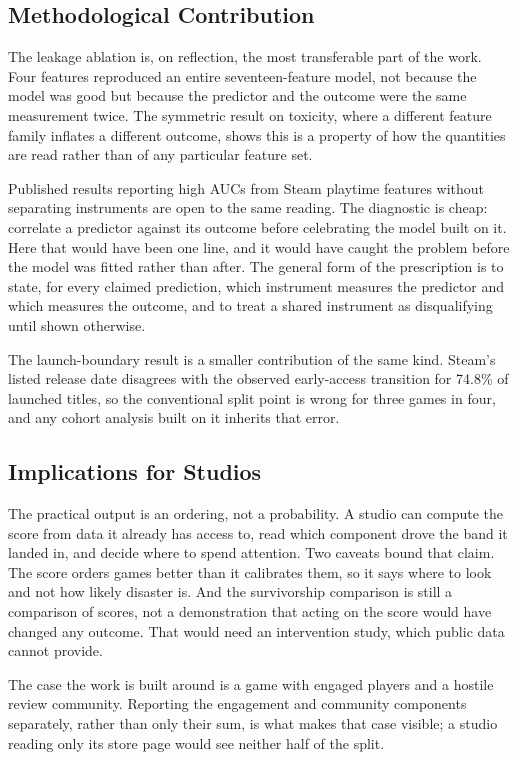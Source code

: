 \documentclass[sigconf]{acmart}
\begin{document}
\subsection{Methodological Contribution}
\label{sec:discMethod}

The leakage ablation is, on reflection, the most transferable part of the work. Four features
reproduced an entire seventeen-feature model, not because the model was good but because the
predictor and the outcome were the same measurement twice. The symmetric result on toxicity, where
a different feature family inflates a different outcome, shows this is a property of how the
quantities are read rather than of any particular feature set.

Published results reporting high AUCs from Steam playtime features without separating instruments
are open to the same reading. The diagnostic is cheap: correlate a predictor against its outcome
before celebrating the model built on it. Here that would have been one line, and it would have
caught the problem before the model was fitted rather than after. The general form of the
prescription is to state, for every claimed prediction, which instrument measures the predictor and
which measures the outcome, and to treat a shared instrument as disqualifying until shown otherwise.

The launch-boundary result is a smaller contribution of the same kind. Steam's listed release date
disagrees with the observed early-access transition for 74.8\% of launched titles, so the
conventional split point is wrong for three games in four, and any cohort analysis built on it
inherits that error.

\subsection{Implications for Studios}
\label{sec:discStudios}

The practical output is an ordering, not a probability. A studio can compute the score from data it
already has access to, read which component drove the band it landed in, and decide where to spend
attention. Two caveats bound that claim. The score orders games better than it calibrates them, so
it says where to look and not how likely disaster is. And the survivorship comparison is still a
comparison of scores, not a demonstration that acting on the score would have changed any outcome.
That would need an intervention study, which public data cannot provide.

The case the work is built around is a game with engaged players and a hostile review community.
Reporting the engagement and community components separately, rather than only their sum, is what
makes that case visible; a studio reading only its store page would see neither half of the split.
\end{document}
